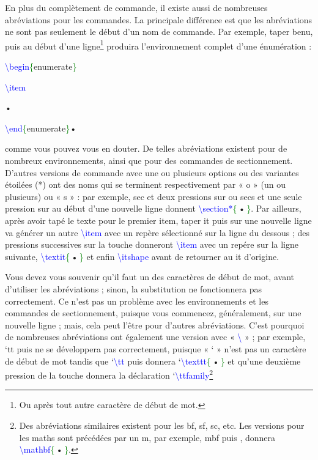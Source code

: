 \documentclass[12pt,french]{article}
\newcommand{\esc}{{\WD \symbol{82}}}
\newcommand{\pointbleu}{\colorbox{cyan!40}{\kern-3pt•\kern-3pt}}
\newcommand{\pointbleua}{\,\colorbox{cyan!40}{\kern-4pt•\kern-4pt}\,}
\newcommand{\fontelatex}{\ttfamily}
\newcommand{\argument}[1]{{\fontelatex#1}}
\newcommand{\opt}[1]{{\fontelatex[#1]}}
\newcommand{\argt}[1]{{\fontelatex\textcolor{green}{\{}#1\textcolor{green}{\}}}}
\newcommand{\com}[1]{{\fontelatex\textcolor{blue}{\textbackslash#1}}}
\newcommand{\coma}[2]{\com{#1}\argt{#2}}
\begin{document}
En plus du complètement de commande, il existe aussi de nombreuses abréviations pour les commandes. La 
principale différence est que les abréviations ne sont pas seulement le début d'un nom de commande. Par exemple, 
taper \argument{benu}, puis \esc{} au début d'une ligne\footnote{Ou après tout autre caractère de début de mot.} 
produira l'environnement complet d'une énumération :

{\parindent=0pt%
\coma{begin}{enumerate}

\com{item}

\pointbleu

\coma{end}{enumerate}•
}

\noindent comme vous pouvez vous en douter. De telles abréviations existent pour de nombreux environnements, 
ainsi que pour des commandes de sectionnement. D'autres versions de commande avec une ou plusieurs options ou 
des variantes étoilées (*) ont des noms qui se terminent respectivement par « \argument{o} » (un ou plusieurs) ou « 
\argument{s} » : par exemple, \argument{sec} et deux pressions sur \esc{} ou \argument{secs} et une seule pression 
sur \esc{} au début d'une nouvelle ligne donnent \coma{section*}{\pointbleua}. Par ailleurs, après avoir tapé le texte 
pour le premier item, taper \argument{it} puis \esc{} sur une nouvelle ligne va générer un autre \com{item} avec un 
repère sélectionné sur la ligne du dessous ; des pressions successives sur la touche \esc{} donneront \com{item}
\opt{\pointbleua} avec un repére sur la ligne suivante, \coma{textit}{\pointbleua} et enfin \com{itshape} avant de 
retourner au \argument{it} d'origine.

Vous devez vous souvenir qu'il faut un des caractères de début de mot, avant d'utiliser les abréviations ; sinon, la 
substitution ne fonctionnera pas correctement. Ce n'est pas un problème avec les environnements et les commandes 
de sectionnement, puisque vous commencez, généralement, sur une nouvelle ligne ; mais, cela peut l'être pour 
d'autres abréviations. C'est pourquoi de nombreuses abréviations ont également une version avec « \com{} » ; par 
exemple, `\argument{tt} puis \esc{} ne se développera pas correctement, puisque « ` » n'est pas un caractère de 
début de mot tandis que `\com{tt} puis \esc{} donnera `\coma{texttt}{\pointbleua} et qu'une deuxième pression de la 
touche \esc{} donnera la déclaration `\com{ttfamily}\footnote{Des abréviations similaires existent pour les 
\argument{bf}, \argument{sf}, \argument{sc}, etc. Les versions pour les maths sont précédées par un \argument{m}, 
par exemple, \argument{mbf} puis \esc{}, donnera \coma{mathbf}{\pointbleua}.}
\end{document}
